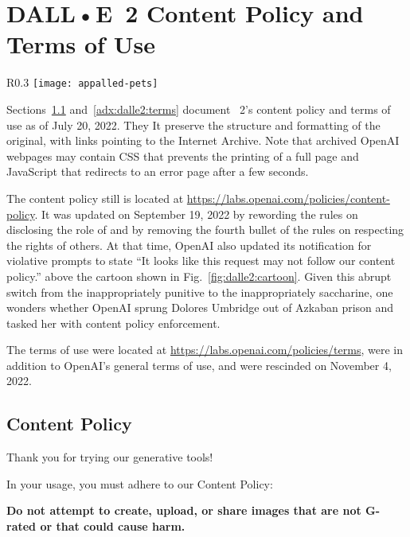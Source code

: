 
\section{DALL•E~2 Content Policy and Terms of Use}
\label{adx:dalle2:policies}

\begin{wrapfigure}[9]{R}{0.3\textwidth}
\centering
\texttt{[image: appalled-pets]}
\caption{Be nice to \DALLE's pets!}\label{fig:dalle2:cartoon}
\end{wrapfigure}

Sections~\ref{adx:dalle2:contentpolicy} and~\ref{adx:dalle2:terms} document
\DALLE~2's content policy and terms of use as of July 20, 2022. They It preserve
the structure and formatting of the original, with links pointing to the
Internet Archive. Note that archived OpenAI webpages may contain CSS that
prevents the printing of a full page and JavaScript that redirects to an error
page after a few seconds.

The content policy still is located at
\url{https://labs.openai.com/policies/content-policy}. It was updated on
September 19, 2022 by rewording the rules on disclosing the role of \AI{} and by
removing the fourth bullet of the rules on respecting the rights of others. At
that time, OpenAI also updated its notification for violative prompts to state
``It looks like this request may not follow our content policy.'' above the
cartoon shown in Fig.~\ref{fig:dalle2:cartoon}. Given this abrupt switch from
the inappropriately punitive to the inappropriately saccharine, one wonders
whether OpenAI sprung Dolores Umbridge out of Azkaban prison and tasked her with
content policy enforcement.

The terms of use were located at
\url{https://labs.openai.com/policies/terms}, were in addition to OpenAI's
general terms of use, and were rescinded on November 4, 2022.


\subsection{Content Policy}
\label{adx:dalle2:contentpolicy}

Thank you for trying our generative \AI{} tools!

\noindent In your usage, you must adhere to our Content Policy:

\vspace{.5em}\noindent\textbf{Do not attempt to create, upload, or share images
    that are not G-rated or that could cause harm.}

